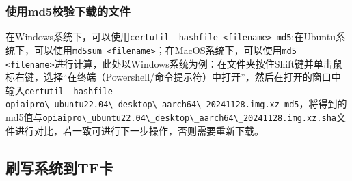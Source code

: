 \subsubsection{使用md5校验下载的文件}\label{ux4f7fux7528md5ux6821ux9a8cux4e0bux8f7dux7684ux6587ux4ef6}

在Windows系统下，可以使用\passthrough{\lstinline!certutil -hashfile <filename> md5!};在Ubuntu系统下，可以使用\passthrough{\lstinline!md5sum <filename>!}；在MacOS系统下，可以使用\passthrough{\lstinline!md5 <filename>!}进行计算，此处以Windows系统为例：在文件夹按住Shift键并单击鼠标右键，选择``在终端（Powershell/命令提示符）中打开''，然后在打开的窗口中输入\passthrough{\lstinline!certutil -hashfile opiaipro\_ubuntu22.04\_desktop\_aarch64\_20241128.img.xz md5!}，将得到的md5值与\passthrough{\lstinline!opiaipro\_ubuntu22.04\_desktop\_aarch64\_20241128.img.xz.sha!}文件进行对比，若一致可进行下一步操作，否则需要重新下载。

\subsection{刷写系统到TF卡}\label{ux5237ux5199ux7cfbux7edfux5230tfux5361}

